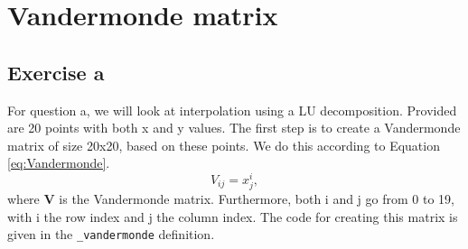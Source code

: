 \section{Vandermonde matrix}


\subsection{Exercise a}

For question a, we will look at interpolation using a LU decomposition. Provided are 20 points with both x and y values. The first step is to create a Vandermonde matrix of size 20x20, based on these points. We do this according to Equation \ref{eq:Vandermonde}.
\begin{equation}\label{eq:Vandermonde}
    V_{ij} = x^i_j,
\end{equation}
where \textbf{V} is the Vandermonde matrix. Furthermore, both i and j go from 0 to 19, with i the row index and j the column index. The code for creating this matrix is given in the \texttt{\_vandermonde} definition.  

